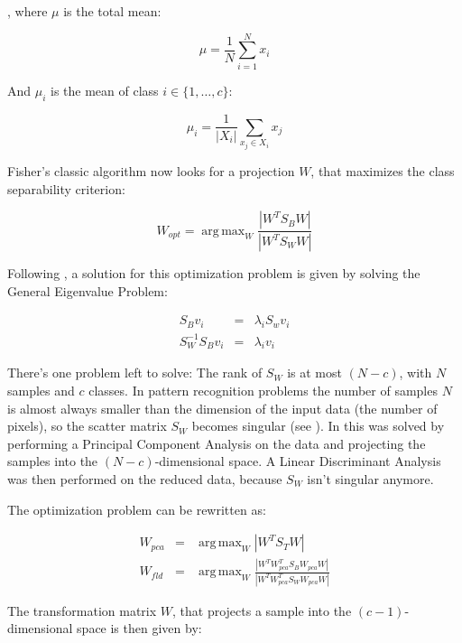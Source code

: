 , where $\mu$ is the total mean:

\begin{equation}
\mu = \frac{1}{N} \sum_{i=1}^{N} x_i
\end{equation}

And $\mu_i$ is the mean of class $i \in \{1,\ldots,c\}$:

\begin{equation}
\mu_i = \frac{1}{|X_i|} \sum_{x_j \in X_i} x_j
\end{equation}

Fisher's classic algorithm now looks for a projection $W$, that maximizes the class separability criterion:

\begin{equation}
W_{opt} = \operatorname{arg\,max}_{W} \frac{|W^T S_B W|}{|W^T S_W W|}
\end{equation}

Following \cite{belhumeru97}, a solution for this optimization problem is given by solving the General Eigenvalue Problem:

\begin{eqnarray}
\label{eqn:general_eigenwert}
S_{B} v_{i} & = & \lambda_{i} S_w v_{i} \nonumber \\
S_{W}^{-1} S_{B} v_{i} & = & \lambda_{i} v_{i}
\end{eqnarray}

There's one problem left to solve: The rank of $S_{W}$ is at most $(N-c)$, with $N$ samples and $c$ classes. In pattern recognition problems the number of samples $N$ is almost always smaller than the dimension of the input data (the number of pixels), so the scatter matrix $S_{W}$ becomes singular (see \cite{Raudys1991}). In \cite{belhumeru97} this was solved by performing a Principal Component Analysis on the data and projecting the samples into the $(N-c)$-dimensional space. A Linear Discriminant Analysis was then performed on the reduced data, because $S_{W}$ isn't singular anymore.

The optimization problem can be rewritten as:

\begin{eqnarray}
W_{pca} & = & \operatorname{arg\,max}_{W} |W^T S_T W| \\
W_{fld} & = & \operatorname{arg\,max}_{W} \frac{|W^T W_{pca}^T S_{B} W_{pca} W|}{|W^T W_{pca}^T S_{W} W_{pca} W|}
\end{eqnarray}

The transformation matrix $W$, that projects a sample into the $(c-1)$-dimensional space is then given by:

